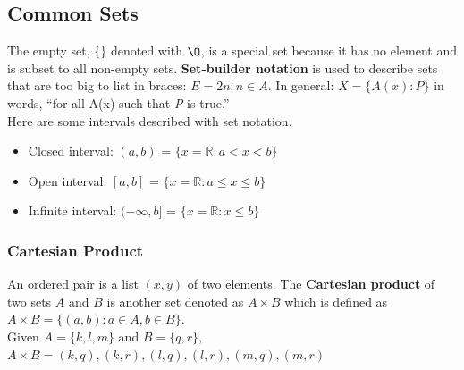 \documentclass[12pt]{report}
\begin{document}
\subsection{Common Sets}

\bigskip

The empty set, $\{\}$ denoted with $\O$, is a special set because it has no element and is subset to all non-empty sets.
\textbf{Set-builder notation} is used to describe sets that are too big to list in braces: $E={2n:n \in A}$.
In general: $X=\{A(x):P\}$ in words, ``for all A(x) such that \textit{P} is true.''\\
Here are some intervals described with set notation.
\begin{itemize}
    \item Closed interval: $(a, b)$ = $\{x=\mathbb R:a < x < b\}$
    \item Open interval: $[a, b]$ = $\{x=\mathbb R:a \leq x \leq b\}$
    \item Infinite interval: $(-\infty, b]$ = $\{x=\mathbb R:x \leq b\}$
\end{itemize}

\subsubsection{Cartesian Product}

\hspace{\parindent}An ordered pair is a list $(x, y)$ of two elements. The \textbf{Cartesian product} of two sets $A$ and $B$ is another set denoted as $A \times B$ which is defined as $A \times B = \{(a, b):a\in A, b\in B\}$.\\
Given $A=\{k,l,m\}$ and $B=\{q,r\}$, $A \times B = {(k,q),(k,r),(l,q),(l, r),(m, q),(m,r)}$\vspace{5pt}
\end{document}
